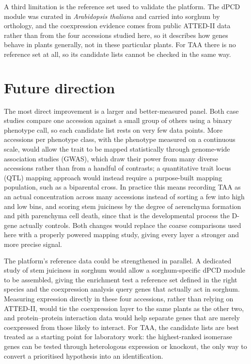 \hspace{1em}A third limitation is the reference set used to validate the platform. The dPCD module was curated in \textit{Arabidopsis thaliana} and carried into sorghum by orthology, and the coexpression evidence comes from public ATTED-II data rather than from the four accessions studied here, so it describes how genes behave in plants generally, not in these particular plants. For TAA there is no reference set at all, so its candidate lists cannot be checked in the same way.

\section{Future direction}
\hspace{1em}The most direct improvement is a larger and better-measured panel. Both case studies compare one accession against a small group of others using a binary phenotype call, so each candidate list rests on very few data points. More accessions per phenotype class, with the phenotype measured on a continuous scale, would allow the trait to be mapped statistically through genome-wide association studies (GWAS), which draw their power from many diverse accessions rather than from a handful of contrasts; a quantitative trait locus (QTL) mapping approach would instead require a purpose-built mapping population, such as a biparental cross. In practice this means recording TAA as an actual concentration across many accessions instead of sorting a few into high and low bins, and scoring stem juiciness by the degree of aerenchyma formation and pith parenchyma cell death, since that is the developmental process the D-gene actually controls. Both changes would replace the coarse comparisons used here with a properly powered mapping study, giving every layer a stronger and more precise signal.

\hspace{1em}The platform's reference data could be strengthened in parallel. A dedicated study of stem juiciness in sorghum would allow a sorghum-specific dPCD module to be assembled, giving the enrichment test a reference set defined in the right species and the coexpression analysis query genes that actually act in sorghum. Measuring expression directly in these four accessions, rather than relying on ATTED-II, would tie the coexpression layer to the same plants as the other two, and protein--protein interaction data would help separate genes that are merely coexpressed from those likely to interact. For TAA, the candidate lists are best treated as a starting point for laboratory work: the highest-ranked isomerase genes can be tested through heterologous expression or knockout, the only way to convert a prioritised hypothesis into an identification.

